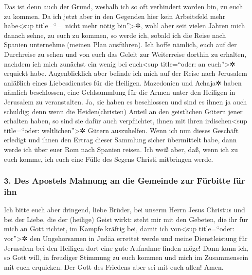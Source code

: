  Das ist denn auch der Grund, weshalb ich so oft
verhindert worden bin, zu euch zu kommen.  Da ich jetzt
aber in den Gegenden hier kein Arbeitsfeld mehr habe\textless sup
title=``=~nicht mehr nötig bin''\textgreater✲, wohl aber seit vielen
Jahren mich danach sehne, zu euch zu kommen,  so werde
ich, sobald ich die Reise nach Spanien unternehme (meinen Plan
ausführen). Ich hoffe nämlich, euch auf der Durchreise zu sehen und von
euch das Geleit zur Weiterreise dorthin zu erhalten, nachdem ich mich
zunächst ein wenig bei euch\textless sup title=``oder: an
euch''\textgreater✲ erquickt habe.  Augenblicklich aber
befinde ich mich auf der Reise nach Jerusalem anläßlich eines
Liebesdienstes für die Heiligen.  Mazedonien und Achaja✲
haben nämlich beschlossen, eine Geldsammlung für die Armen unter den
Heiligen in Jerusalem zu veranstalten.  Ja, sie haben es
beschlossen und sind es ihnen ja auch schuldig; denn wenn die
Heiden(christen) Anteil an den geistlichen Gütern jener erhalten haben,
so sind sie dafür auch verpflichtet, ihnen mit ihren
irdischen\textless sup title=``oder: weltlichen''\textgreater✲ Gütern
auszuhelfen.  Wenn ich nun dieses Geschäft erledigt und
ihnen den Ertrag dieser Sammlung sicher übermittelt habe, dann werde ich
über euer Rom nach Spanien reisen.  Ich weiß aber, daß,
wenn ich zu euch komme, ich euch eine Fülle des Segens Christi
mitbringen werde.

\hypertarget{des-apostels-mahnung-an-die-gemeinde-zur-fuxfcrbitte-fuxfcr-ihn}{%
\subsubsection{3. Des Apostels Mahnung an die Gemeinde zur Fürbitte für
ihn}\label{des-apostels-mahnung-an-die-gemeinde-zur-fuxfcrbitte-fuxfcr-ihn}}

 Ich bitte euch aber dringend, liebe Brüder, bei unserm
Herrn Jesus Christus und bei der Liebe, die der (heilige) Geist wirkt:
steht mir mit den Gebeten, die ihr für mich an Gott richtet, im Kampfe
kräftig bei,  damit ich von\textless sup title=``oder:
vor''\textgreater✲ den Ungehorsamen in Judäa errettet werde und meine
Dienstleistung für Jerusalem bei den Heiligen dort eine gute Aufnahme
finden möge!  Dann kann ich, so Gott will, in freudiger
Stimmung zu euch kommen und mich im Zusammensein mit euch erquicken.
 Der Gott des Friedens aber sei mit euch allen! Amen.


